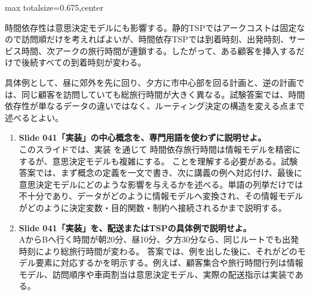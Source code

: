 \begin{adjustbox}{max totalsize={\textwidth}{0.675\textheight},center}
\begin{minipage}{\textwidth}
\begin{minipage}[t]{0.485\textwidth}
時間依存性は意思決定モデルにも影響する。静的TSPではアークコストは固定なので訪問順だけを考えればよいが、時間依存TSPでは到着時刻、出発時刻、サービス時間、次アークの旅行時間が連鎖する。したがって、ある顧客を挿入するだけで後続すべての到着時刻が変わる。\par
具体例として、昼に郊外を先に回り、夕方に市中心部を回る計画と、逆の計画では、同じ顧客を訪問していても総旅行時間が大きく異なる。試験答案では、時間依存性が単なるデータの違いではなく、ルーティング決定の構造を変える点まで述べるとよい。\par
{}
\begin{enumerate}
\item \textbf{Slide 041「実装」の中心概念を、専門用語を使わずに説明せよ。}\\このスライドでは、実装 を通じて 時間依存旅行時間は情報モデルを精密にするが、意思決定モデルも複雑にする。 ことを理解する必要がある。試験答案では、まず概念の定義を一文で書き、次に講義の例へ対応付け、最後に意思決定モデルにどのような影響を与えるかを述べる。単語の列挙だけでは不十分であり、データがどのように情報モデルへ変換され、その情報モデルがどのように決定変数・目的関数・制約へ接続されるかまで説明する。
\item \textbf{Slide 041「実装」を、配送またはTSPの具体例で説明せよ。}\\AからBへ行く時間が朝20分、昼10分、夕方30分なら、同じルートでも出発時刻により総旅行時間が変わる。 答案では、例を出した後に、それがどのモデル要素に対応するかを明示する。例えば、顧客集合や旅行時間行列は情報モデル、訪問順序や車両割当は意思決定モデル、実際の配送指示は実装である。
\end{enumerate}
\end{minipage}
\end{minipage}
\end{adjustbox}


